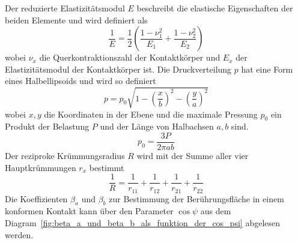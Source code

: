 %
Der reduzierte Elastizitätsmodul $E$ beschreibt die elastische Eigenschaften der beiden Elemente und wird definiert als
\begin{equation}
    \label{eq:reduzierter_elastizitaetsmodul}
    \frac{1}{E} = \frac{1}{2}  \left( \frac{1 - \nu_1^2}{E_1} + \frac{1 - \nu_2^2}{E_2} \right)
\end{equation}
%
wobei $\nu_x$ die Querkontraktionszahl der Kontaktkörper und $E_x$ der Elastizitätsmodul der Kontaktkörper ist.
Die Druckverteilung $p$ hat eine Form eines Halbellipsoids und wird so definiert
\begin{equation}
    \label{eq:druckverteilung}
    p = p_0  \sqrt{1 - \left( \frac{x}{b} \right)^2 - \left( \frac{y}{a} \right)^2}
\end{equation}
%
wobei $x, y$ die Koordinaten in der Ebene und die maximale Pressung $p_0$ ein Produkt der Belastung $P$ und der Länge von Halbachsen $a, b$ sind.
\begin{equation}
    \label{eq:maximale_pressung}
    p_0 = \frac{3  P}{2  \pi  a  b}
\end{equation}
%
Der reziproke Krümmungsradius $R$ wird mit der Summe aller vier Hauptkrümmungen $r_x$ bestimmt
\begin{equation}
    \label{eq:kruemmungsradius}
    \frac{1}{R} = \frac{1}{r_{11}} + \frac{1}{r_{12}} + \frac{1}{r_{21}} + \frac{1}{r_{22}}
\end{equation}
%
Die Koeffizienten $\beta_a$ und $\beta_b$ zur Bestimmung der Berührungsfläche in einem konformen Kontakt kann über den Parameter $\cos{\psi}$ aus dem Diagram~\ref{fig:beta_a_und_beta_b_als_funktion_der_cos_psi} abgelesen werden.
